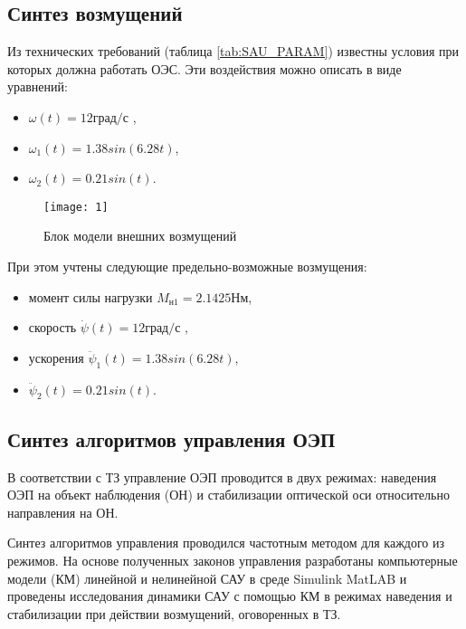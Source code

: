 \subsection{Синтез возмущений} \label{ch:ch4/sect2+1}

Из технических требований (таблица \ref{tab:SAU_PARAM}) известны условия при которых должна работать ОЭС. Эти воздействия можно описать в виде уравнений:
\begin{itemize}
	\item \( \omega  \left( t \right) = 12 \textit{град/с} \) ,
	\item \(  \omega _{1} ( t ) =1.38sin \left( 6.28 t \right) \),
	\item \( \omega_2 (t) = 0.21 sin(t) \).
\end{itemize}

\begin{figure}[ht]
	\centering
	\texttt{[image: 1]} 
	\caption{Блок модели внешних возмущений}
	\label{fig:la_model}
\end{figure}

При этом учтены следующие предельно-возможные возмущения: 
\begin{itemize}
	\item момент силы нагрузки $M_{\textit{н1}} = 2.1425 \textit{Нм}$,
	\item скорость \( \dot \psi  \left( t \right) = 12 \textit{град/с} \) ,
	\item ускорения \(  \ddot \psi _{1} \left( t \right) =1.38sin \left( 6.28 t \right) \),
	\item \( \ddot \psi_2 (t) = 0.21 sin(t) \).
\end{itemize}

\subsection{Синтез алгоритмов управления ОЭП} \label{ch:ch4/sect4-}

В соответствии с ТЗ управление ОЭП проводится в двух режимах:
наведения ОЭП на объект наблюдения (ОН) и стабилизации оптической оси относительно направления на ОН. 

Синтез алгоритмов управления проводился частотным методом \cite[]{Bessekerski} для каждого из режимов. На основе полученных законов управления разработаны компьютерные модели (КМ) линейной и нелинейной САУ в среде Simulink MatLAB и проведены исследования динамики САУ с помощью КМ в режимах наведения и стабилизации при действии возмущений, оговоренных в ТЗ.

